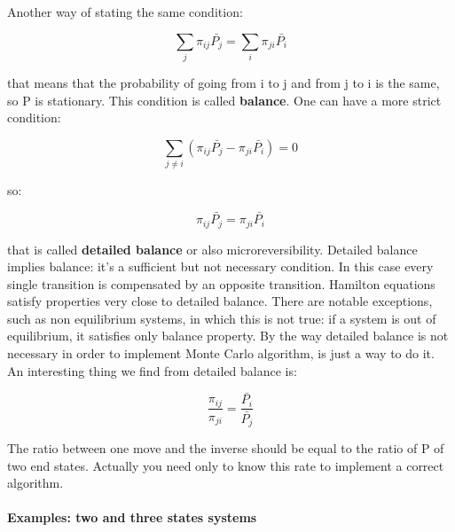 \documentclass[a4paper, italian, openany]{book}
\begin{document}
Another way of stating the same condition:

$$\sum_j \pi_{ij} \bar{P_j} = \sum_i \pi_{ji} \bar{P_i}$$

that means that the probability of going from i to j and from j to i is the same, so P is stationary. This condition is called \textbf{balance}.\newline
One can have a more strict condition:

$$\sum_{j\ne i} \left ( \pi_{ij}\bar{P_j} - \pi_{ji}\bar{P_i} \right ) = 0$$

so:

$$\pi_{ij}\bar{P_j} = \pi_{ji}\bar{P_i}$$

that is called \textbf{detailed balance} or also microreversibility. Detailed balance implies balance: it's a sufficient but not necessary condition. In this case every single transition is compensated by an opposite transition.\newline
Hamilton equations satisfy properties very close to detailed balance. There are notable exceptions, such as non equilibrium systems, in which this is not true: if a system is out of equilibrium, it satisfies only balance property. By the way detailed balance is not necessary in order to implement Monte Carlo algorithm, is just a way to do it.\newline
An interesting thing we find from detailed balance is:

$$\frac{\pi_{ij}}{\pi_{ji}} = \frac{\bar{P_i}}{\bar{P_j}}$$

The ratio between one move and the inverse should be equal to the ratio of P of two end states. Actually you need only to know this rate to implement a correct algorithm.

\paragraph{Examples: two and three states systems}
\end{document}
